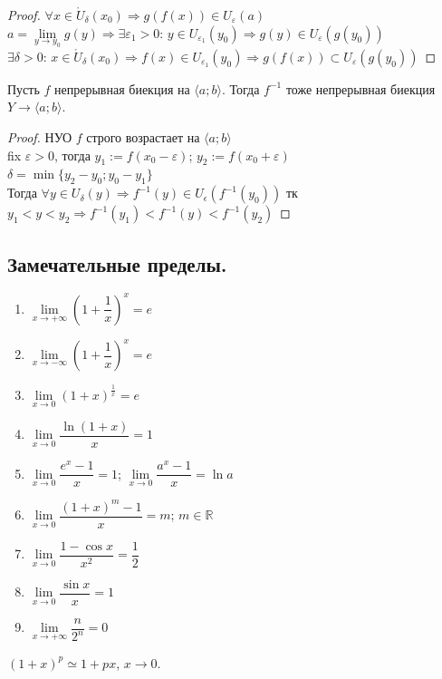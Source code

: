 \documentclass[12pt]{article}
\begin{document}
	\begin{proof}
		$\forall x \in \mathring{U}_{\delta}(x_0) \Rightarrow g(f(x)) \in U_{\varepsilon} (a)$ \\
		$a = \lim \limits_{y \rightarrow y_0} g(y) \Rightarrow \exists \varepsilon_1 > 0$: $y \in U_{\varepsilon_1} (y_0) \Rightarrow g(y) \in U_{\varepsilon} (g(y_0))$ \\
		$\exists \delta > 0$: $x \in \mathring{U}_{\delta} (x_0) \Rightarrow f(x) \in U_{\varepsilon_1} (y_0) \Rightarrow g(f(x)) \subset U_{\varepsilon} (g(y_0))$
	\end{proof}
	\begin{theorem}
		Пусть $f$ непрерывная биекция на $\langle a; b \rangle$. Тогда $f^{-1}$ тоже непрерывная биекция $Y \rightarrow \langle a; b \rangle$.
	\end{theorem}
	\begin{proof}
		НУО $f$ строго возрастает на $\langle a; b \rangle$ \\
		fix $\varepsilon > 0$, тогда $y_1 := f(x_0 - \varepsilon)$; $y_2 := f(x_0 + \varepsilon)$ \\
		$\delta = \min \{ y_2 - y_0; y_0 - y_1 \}$ \\
		Тогда $\forall y \in U_{\delta} (y) \Rightarrow f^{-1} (y) \in U_{\epsilon} (f^{-1} (y_0))$ тк $y_1 < y < y_2 \Rightarrow f^{-1} (y_1) < f^{-1} (y) < f^{-1} (y_2)$
	\end{proof}
	\subsection{Замечательные пределы.}
	\begin{enumerate}
		\item $\lim\limits_{x \rightarrow +\infty} \left(1 + \dfrac{1}{x}\right)^x = e$
		\item $\lim\limits_{x \rightarrow -\infty} \left(1 + \dfrac{1}{x}\right)^x = e$
		\item $\lim\limits_{x \rightarrow 0} (1 + x)^{\frac{1}{x}} = e$
		\item $\lim\limits_{x \rightarrow 0} \dfrac{\ln (1 + x)}{x} = 1$
		\item $\lim\limits_{x \rightarrow 0} \dfrac{e^x - 1}{x} = 1$; $\lim\limits_{x \rightarrow 0} \dfrac{a^x - 1}{x} = \ln a$
		\item $\lim\limits_{x \rightarrow 0} \dfrac{(1 + x)^m - 1}{x} = m$; $m \in \mathbb{R}$
		\item $\lim\limits_{x \rightarrow 0} \dfrac{1 - \cos x}{x^2} = \dfrac{1}{2}$
		\item $\lim\limits_{x \rightarrow 0} \dfrac{\sin x}{x} = 1$
		\item $\lim\limits_{x \rightarrow +\infty} \dfrac{n}{2^n} = 0$
	\end{enumerate}
	\begin{statement}
		$(1 + x)^p \simeq 1 + px$, $x \rightarrow 0$.
	\end{statement}
\end{document}
